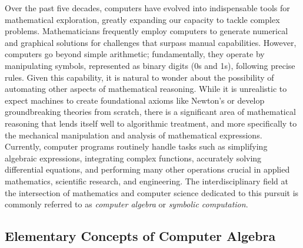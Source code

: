 Over the past five decades, computers have evolved into indispensable tools for mathematical exploration, greatly expanding our capacity to tackle complex problems. Mathematicians frequently employ computers to generate numerical and graphical solutions for challenges that surpass manual capabilities. However, computers go beyond simple arithmetic; fundamentally, they operate by manipulating symbols, represented as binary digits (0s and 1s), following precise rules. Given this capability, it is natural to wonder about the possibility of automating other aspects of mathematical reasoning. While it is unrealistic to expect machines to create foundational axioms like Newton's or develop groundbreaking theories from scratch, there is a significant area of mathematical reasoning that lends itself well to algorithmic treatment, and more specifically to the mechanical manipulation and analysis of mathematical expressions. Currently, computer programs routinely handle tasks such as simplifying algebraic expressions, integrating complex functions, accurately solving differential equations, and performing many other operations crucial in applied mathematics, scientific research, and engineering. The interdisciplinary field at the intersection of mathematics and computer science dedicated to this pursuit is commonly referred to as \emph{computer algebra} or \emph{symbolic computation}.

\subsection{Elementary Concepts of Computer Algebra}


